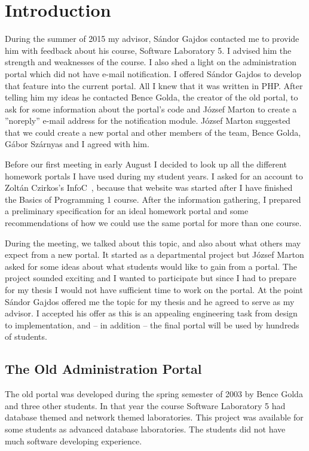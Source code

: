 \chapter{Introduction}

During the summer of 2015 my advisor, Sándor Gajdos contacted me to provide him with feedback about his course, Software Laboratory 5. I advised him the strength and weaknesses of the course. I also shed a light on the administration portal which did not have e-mail notification. I offered Sándor Gajdos to develop that feature into the current portal. All I knew that it was written in PHP. After telling him my ideas he contacted Bence Golda, the creator of the old portal, to ask for some information about the portal's code and József Marton to create a ''noreply'' e-mail address for the notification module. József Marton suggested that we could create a new portal and other members of the team, Bence Golda, Gábor Szárnyas and I agreed with him. 

Before our first meeting in early August I decided to look up all the different homework portals I have used during my student years. I asked for an account to Zoltán Czirkos's InfoC~\cite{InfoC}, because that website was started after I have finished the Basics of Programming 1 course. After the information gathering, I prepared a preliminary specification for an ideal homework portal and some recommendations of how we could use the same portal for more than one course.

During the meeting, we talked about this topic, and also about what others may expect from a new portal. It started as a departmental project but József Marton asked for some ideas about what students would like to gain from a portal. The project sounded exciting and I wanted to participate but since I had to prepare for my thesis I would not have sufficient time to work on the portal. At the point Sándor Gajdos offered me the topic for my thesis and he agreed to serve as my advisor. I accepted his offer as this is an appealing engineering task from design to implementation, and -- in addition -- the final portal will be used by hundreds of students.


\section{The Old Administration Portal} 
The old portal was developed during the spring semester of 2003 by Bence Golda and three other students. In that year the course Software Laboratory 5 had database themed and network themed laboratories. This project was available for some students as advanced database laboratories. The students did not have much software developing experience. 

